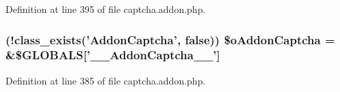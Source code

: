 Definition at line 395 of file captcha.\+addon.\+php.

\hypertarget{captcha_8addon_8php_ab9ab3bb5657fc72fca17e44743d1d20a}{
\subsubsection[{\$o\+Addon\+Captcha}]{ (!class\+\_\+exists('Addon\+Captcha', false)) \$o\+Addon\+Captcha = \&\$G\+L\+O\+B\+A\+L\+S\mbox{[}'\+\_\+\+\_\+\+Addon\+Captcha\+\_\+\+\_\+'\mbox{]}}}\label{captcha_8addon_8php_ab9ab3bb5657fc72fca17e44743d1d20a}


Definition at line 385 of file captcha.\+addon.\+php.

